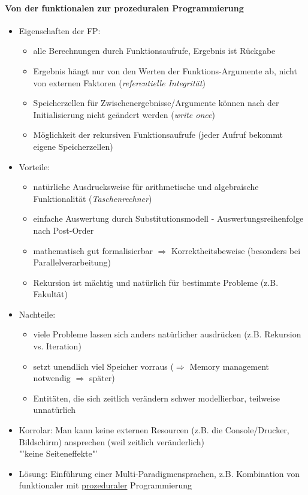 \documentclass{article}
\begin{document}
	 	\paragraph{Von der funktionalen zur prozeduralen Programmierung}
	 	\begin{itemize}
	 		\item Eigenschaften der FP:
	 		\begin{itemize}
	 			\item alle Berechnungen durch Funktionsaufrufe, Ergebnis ist Rückgabe
	 			\item Ergebnis hängt nur von den Werten der Funktions-Argumente ab, nicht von externen Faktoren (\textit{referentielle Integrität})
	 			\item Speicherzellen für Zwischenergebnisse/Argumente können nach der Initialisierung nicht geändert werden (\textit{write once})
	 			\item Möglichkeit der rekursiven Funktionsaufrufe (jeder Aufruf bekommt eigene Speicherzellen)
	 		\end{itemize}
	 		\item Vorteile:
	 		\begin{itemize}
	 			\item natürliche Ausdrucksweise für arithmetische und algebraische Funktionalität (\textit{Taschenrechner})
	 			\item einfache Auswertung durch Substitutionsmodell - Auswertungsreihenfolge nach Post-Order
	 			\item mathematisch gut formalisierbar $\Rightarrow$ Korrektheitsbeweise (besonders bei Parallelverarbeitung)
	 			\item Rekursion ist mächtig und natürlich für bestimmte Probleme (z.B. Fakultät)
	 		\end{itemize}
	 		\item Nachteile:
	 		\begin{itemize}
	 			\item viele Probleme lassen sich anders natürlicher ausdrücken (z.B. Rekursion vs. Iteration)
	 			\item setzt unendlich viel Speicher vorraus ($\Rightarrow$ Memory management notwendig $\Rightarrow$ später)
	 			\item Entitäten, die sich zeitlich verändern schwer modellierbar, teilweise unnatürlich
	 		\end{itemize}
	 		\item Korrolar: Man kann keine externen Resourcen (z.B. die Console/Drucker, Bildschirm) ansprechen (weil zeitlich veränderlich) \\ "'keine Seiteneffekte"'
	 		\item Lösung: Einführung einer Multi-Paradigmensprachen, z.B. Kombination von funktionaler mit \underline{prozeduraler} Programmierung
	 	\end{itemize}
	 	
\end{document}
